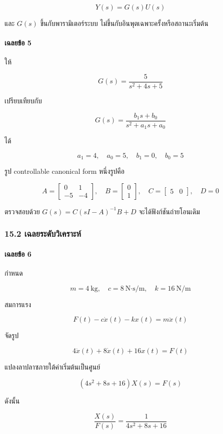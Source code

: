 \[
Y(s)=G(s)U(s)
\]

และ $G(s)$ ขึ้นกับพารามิเตอร์ระบบ ไม่ขึ้นกับอินพุตเฉพาะครั้งหรือสถานะเริ่มต้น

\paragraph{เฉลยข้อ 5}

ให้

\[
G(s)=\frac{5}{s^2+4s+5}
\]

เปรียบเทียบกับ

\[
G(s)=\frac{b_1s+b_0}{s^2+a_1s+a_0}
\]

ได้

\[
a_1=4,\quad a_0=5,\quad b_1=0,\quad b_0=5
\]

รูป controllable canonical form หนึ่งรูปคือ

\[
\boxed{
A=
\begin{bmatrix}
0 & 1\\
-5 & -4
\end{bmatrix},
\quad
B=
\begin{bmatrix}
0\\
1
\end{bmatrix},
\quad
C=
\begin{bmatrix}
5 & 0
\end{bmatrix},
\quad
D=0
}
\]

ตรวจสอบด้วย $G(s)=C(sI-A)^{-1}B+D$ จะได้ฟังก์ชันถ่ายโอนเดิม

\subsubsection{15.2 เฉลยระดับวิเคราะห์}

\paragraph{เฉลยข้อ 6}

กำหนด

\[
m=4\ \text{kg},\quad
c=8\ \text{N·s/m},\quad
k=16\ \text{N/m}
\]

สมการแรง

\[
F(t)-c\dot{x}(t)-kx(t)=m\ddot{x}(t)
\]

จัดรูป

\[
\boxed{
4\ddot{x}(t)+8\dot{x}(t)+16x(t)=F(t)
}
\]

แปลงลาปลาซภายใต้ค่าเริ่มต้นเป็นศูนย์

\[
(4s^2+8s+16)X(s)=F(s)
\]

ดังนั้น

\[
\boxed{
\frac{X(s)}{F(s)}
=
\frac{1}{4s^2+8s+16}
}
\]

